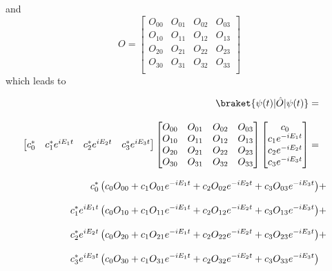 and
\begin{equation*}
    O =
    \begin{bmatrix}
        O_{00} & O_{01} & O_{02} & O_{03}\\
        O_{10} & O_{11} & O_{12} & O_{13}\\
        O_{20} & O_{21} & O_{22} & O_{23}\\
        O_{30} & O_{31} & O_{32} & O_{33}\\
    \end{bmatrix}
\end{equation*}
which leads to


\begin{equation*}
    \begin{aligned}
        \braket{\psi(t)|\hat{O}|\psi(t)} = \\[2.0ex]
        \begin{bmatrix}
            c_0^* & c_1^* e^{i E_1 t} & c_2^* e^{i E_2 t} & c_3^* e^{i E_3 t}
        \end{bmatrix}
        \begin{bmatrix}
            O_{00} & O_{01} & O_{02} & O_{03}\\
            O_{10} & O_{11} & O_{12} & O_{13}\\
            O_{20} & O_{21} & O_{22} & O_{23}\\
            O_{30} & O_{31} & O_{32} & O_{33}\\
        \end{bmatrix}
        \begin{bmatrix}
            c_0  \\
            c_1 e^{-i E_1 t} \\
            c_2 e^{-i E_2 t} \\
            c_3 e^{-i E_3 t}
        \end{bmatrix} = \\[2.0 ex]
        c_0^* \left( c_0 O_{00} + c_1 O_{01} e^{-i E_1 t} + c_2 O_{02} e^{-i E_2 t} + c_3 O_{03} e^{-i E_3 t} \right)& + \\[2.0 ex]
        c_1^* e^{i E_1 t} \left( c_0 O_{10} + c_1 O_{11} e^{-i E_1 t} + c_2 O_{12} e^{-i E_2 t} + c_3 O_{13} e^{-i E_3 t} \right)& +\\[2.0 ex]
        c_2^* e^{i E_2 t} \left( c_0 O_{20} + c_1 O_{21} e^{-i E_1 t} + c_2 O_{22} e^{-i E_2 t} + c_3 O_{23} e^{-i E_3 t} \right)& +\\[2.0 ex]
        c_3^* e^{i E_3 t} \left( c_0 O_{30} + c_1 O_{31} e^{-i E_1 t} + c_2 O_{32} e^{-i E_2 t} + c_3 O_{33} e^{-i E_3 t} \right)& \\[2.0 ex]
    \end{aligned}
\end{equation*}


